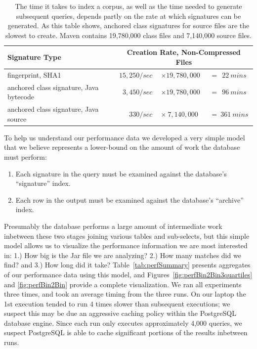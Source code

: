 

\begin{table}[h]
\centering
\begin{tabular}[htbp]{l|r@{}l@{}l}
\textbf{Signature Type}   & \multicolumn{3}{c}{\textbf{Creation Rate, Non-Compressed Files}} \\
\hline
fingerprint, SHA1                         & $15,250 / sec~$ & $\times 19,780,000$ & $~= ~~22 ~mins$ \\
anchored class signature, Java bytecode   & $ 3,450 / sec~$ & $\times 19,780,000$ & $~= ~~96 ~mins$ \\
anchored class signature, Java source     & $   330 / sec~$ & $\times ~7,140,000$ & $~= ~361 ~mins$ \\
\end{tabular}
\caption{
The time it takes to index a corpus, as well as the time needed to generate subsequent queries,
depends partly on the rate at which signatures can be generated.  As this table shows,
anchored class signatures for source files are the slowest to create.  Maven
contains 19,780,000 class files and 7,140,000 source files.
}
\label{tab:sigCreationSpeed}
\end{table}


To help us understand our performance data we developed a very simple
model that we believe represents a lower-bound on the amount of work
the database must perform:

\begin{enumerate}

\item Each signature in the query must be examined against the database's ``signature'' index.

\item Each row in the output must be examined against the database's ``archive'' index.

\end{enumerate}

Presumably the database performs a large amount of intermediate work inbetween these two stages joining
various tables and sub-selects, but this simple model allows us to visualize the
performance information we are most interested in:  1.) How big is the Jar file we are analyzing?  2.) How many matches
did we find? and 3.) How long did it take?
Table~\ref{tab:perfSummary} presents aggregates of our performance data using this model,
and Figures~\ref{fig:perfBin2Bin3quartiles} and \ref{fig:perfBin2Bin}
provide a complete visualization.  We ran all experiments three times, and took an average timing
from the three runs.  On our laptop the 1st execution tended to run 4 times slower than subsequent executions; we suspect
this may be due an aggressive caching policy within the PostgreSQL database engine.
Since each run only executes approximately 4,000 queries, we suspect PostgreSQL is able to
cache significant portions of the results inbetween runs.


